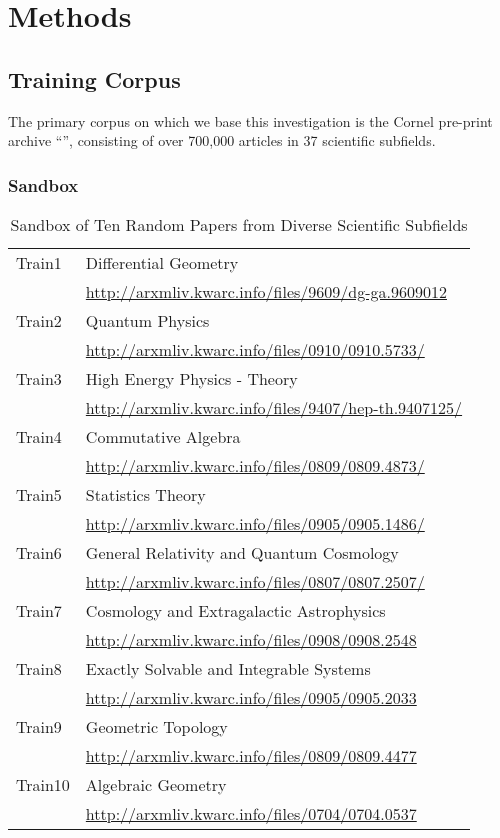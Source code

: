 \chapter{Methods}
\section{Training Corpus}
The primary corpus on which we base this investigation is the Cornel pre-print archive ``\arxiv'', consisting of over 700,000 articles in 37 scientific subfields.
\subsection{\arxiv Sandbox}
\begin{table}\begin{center}
\begin{tabular}{|ll|}\hline
Train1 & Differential Geometry \\ & \url{http://arxmliv.kwarc.info/files/9609/dg-ga.9609012} \\[2mm]
Train2 & Quantum Physics \\  & \url{http://arxmliv.kwarc.info/files/0910/0910.5733/} \\[2mm]
Train3 & High Energy Physics - Theory \\  & \url{http://arxmliv.kwarc.info/files/9407/hep-th.9407125/} \\[2mm]
Train4 & Commutative Algebra \\  & \url{http://arxmliv.kwarc.info/files/0809/0809.4873/} \\[2mm]
Train5 & Statistics Theory \\  & \url{http://arxmliv.kwarc.info/files/0905/0905.1486/} \\[2mm]
Train6 & General Relativity and Quantum Cosmology \\  & \url{http://arxmliv.kwarc.info/files/0807/0807.2507/} \\[2mm]
Train7 & Cosmology and Extragalactic Astrophysics \\  & \url{http://arxmliv.kwarc.info/files/0908/0908.2548} \\[2mm]
Train8 & Exactly Solvable and Integrable Systems \\  & \url{http://arxmliv.kwarc.info/files/0905/0905.2033} \\[2mm]
Train9 & Geometric Topology \\  & \url{http://arxmliv.kwarc.info/files/0809/0809.4477} \\[2mm]
Train10 & Algebraic Geometry \\  & \url{http://arxmliv.kwarc.info/files/0704/0704.0537} \\ \hline
\end{tabular}
\caption{Sandbox of Ten Random \arxiv Papers from Diverse Scientific Subfields}
\end{center}
\end{table}

